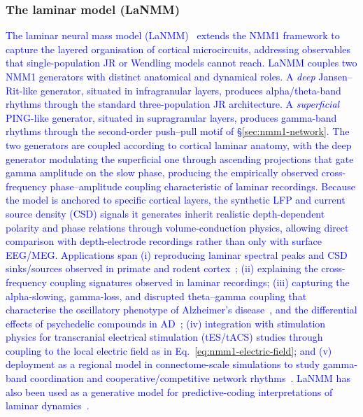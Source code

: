 \documentclass[12pt]{article}
\numberwithin{equation}{section}
\newcommand{\rev}[1]{\textcolor{blue}{#1}}
\begin{document}
\subsubsection*{The laminar model (LaNMM)}
\rev{The laminar neural mass model (LaNMM)~\cite{Ruffini2020P118, SanchezTodo2023} extends the NMM1 framework to capture the layered organisation of cortical microcircuits, addressing observables that single-population JR or Wendling models cannot reach. LaNMM couples two NMM1 generators with distinct anatomical and dynamical roles. A \emph{deep} Jansen--Rit-like generator, situated in infragranular layers, produces alpha/theta-band rhythms through the standard three-population JR architecture. A \emph{superficial} PING-like generator, situated in supragranular layers, produces gamma-band rhythms through the second-order push--pull motif of \S\ref{sec:nmm1-network}. The two generators are coupled according to cortical laminar anatomy, with the deep generator modulating the superficial one through ascending projections that gate gamma amplitude on the slow phase, producing the empirically observed cross-frequency phase--amplitude coupling characteristic of laminar recordings.
Because the model is anchored to specific cortical layers, the synthetic LFP and current source density (CSD) signals it generates inherit realistic depth-dependent polarity and phase relations through volume-conduction physics, allowing direct comparison with depth-electrode recordings rather than only with surface EEG/MEG. Applications span (i) reproducing laminar spectral peaks and CSD sinks/sources observed in primate and rodent cortex~\cite{...,...}; (ii) explaining the cross-frequency coupling signatures observed in laminar recordings; (iii) capturing the alpha-slowing, gamma-loss, and disrupted theta--gamma coupling that characterise the oscillatory phenotype of Alzheimer's disease~\cite{sanchez-todoFastInterneuronDysfunction2025}, and the differential effects of psychedelic compounds in AD~\cite{gendraRestoringOscillatoryDynamics2024}; (iv) integration with stimulation physics for transcranial electrical stimulation (tES/tACS) studies through coupling to the local electric field as in Eq.~\eqref{eq:nmm1-electric-field}; and (v) deployment as a regional model in connectome-scale simulations to study gamma-band coordination and cooperative/competitive network rhythms~\cite{Mercadal2025PINGWB}. LaNMM has also been used as a generative model for predictive-coding interpretations of laminar dynamics~\cite{ruffiniCrossFrequencyCouplingNeural2025}.}
\end{document}
